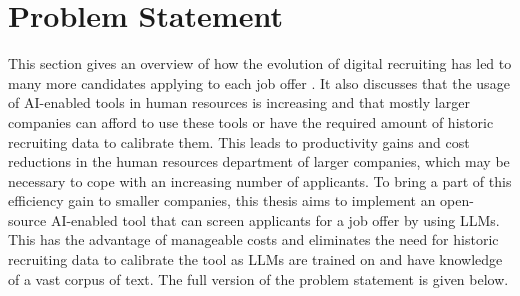 \documentclass[draft,final]{thesisclass} %
\begin{document}
\section{Problem Statement} \label{problem_statement}
This section gives an overview of how the evolution of digital recruiting has led to many more candidates applying to each job offer \parencite[4]{ai_recruiting}.
It also discusses that the usage of \acs{AI}-enabled tools in human resources is increasing and that mostly larger companies can afford to use these tools or have the required amount of historic recruiting data to calibrate them.
This leads to productivity gains and cost reductions in the human resources department of larger companies, which may be necessary to cope with an increasing number of applicants.
To bring a part of this efficiency gain to smaller companies, this thesis aims to implement an open-source \acs{AI}-enabled tool that can screen applicants for a job offer by using \gls{LLM}s.
This has the advantage of manageable costs and eliminates the need for historic recruiting data to calibrate the tool as \gls{LLM}s are trained on and have knowledge of a vast corpus of text.
The full version of the problem statement is given below.
\end{document}
